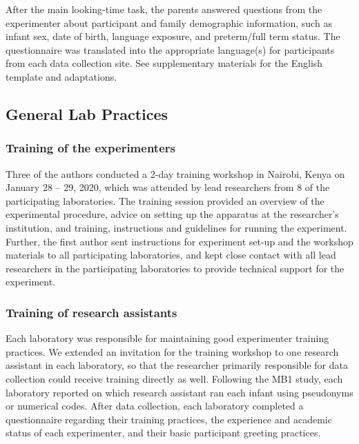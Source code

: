\documentclass[
  ,man,floatsintext]{apa6}
\begin{document}
After the main looking-time task, the parents answered questions from the experimenter about participant and family demographic information, such as infant sex, date of birth, language exposure, and preterm/full term status. The questionnaire was translated into the appropriate language(s) for participants from each data collection site. See supplementary materials for the English template and adaptations.

\hypertarget{general-lab-practices}{%
\subsection{General Lab Practices}\label{general-lab-practices}}

\hypertarget{training-of-the-experimenters}{%
\subsubsection{Training of the experimenters}\label{training-of-the-experimenters}}

Three of the authors conducted a 2-day training workshop in Nairobi, Kenya on January 28 -- 29, 2020, which was attended by lead researchers from 8 of the participating laboratories. The training session provided an overview of the experimental procedure, advice on setting up the apparatus at the researcher's institution, and training, instructions and guidelines for running the experiment. Further, the first author sent instructions for experiment set-up and the workshop materials to all participating laboratories, and kept close contact with all lead researchers in the participating laboratories to provide technical support for the experiment.

\hypertarget{training-of-research-assistants}{%
\subsubsection{Training of research assistants}\label{training-of-research-assistants}}

Each laboratory was responsible for maintaining good experimenter training practices. We extended an invitation for the training workshop to one research assistant in each laboratory, so that the researcher primarily responsible for data collection could receive training directly as well. Following the MB1 study, each laboratory reported on which research assistant ran each infant using pseudonyms or numerical codes. After data collection, each laboratory completed a questionnaire regarding their training practices, the experience and academic status of each experimenter, and their basic participant greeting practices.
\end{document}
